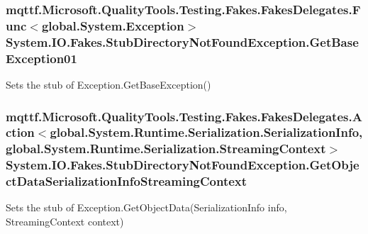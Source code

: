\hypertarget{class_system_1_1_i_o_1_1_fakes_1_1_stub_directory_not_found_exception_a0cdb13e15c8ffdb3b9c954b8de957e8c}{
\subsubsection[{Get\-Base\-Exception01}]{\setlength{\rightskip}{0pt plus 5cm}mqttf.\-Microsoft.\-Quality\-Tools.\-Testing.\-Fakes.\-Fakes\-Delegates.\-Func$<$global.\-System.\-Exception$>$ System.\-I\-O.\-Fakes.\-Stub\-Directory\-Not\-Found\-Exception.\-Get\-Base\-Exception01}}\label{class_system_1_1_i_o_1_1_fakes_1_1_stub_directory_not_found_exception_a0cdb13e15c8ffdb3b9c954b8de957e8c}


Sets the stub of Exception.\-Get\-Base\-Exception()

\hypertarget{class_system_1_1_i_o_1_1_fakes_1_1_stub_directory_not_found_exception_afe59435a6c42ded16fccb94803841468}{
\subsubsection[{Get\-Object\-Data\-Serialization\-Info\-Streaming\-Context}]{\setlength{\rightskip}{0pt plus 5cm}mqttf.\-Microsoft.\-Quality\-Tools.\-Testing.\-Fakes.\-Fakes\-Delegates.\-Action$<$global.\-System.\-Runtime.\-Serialization.\-Serialization\-Info, global.\-System.\-Runtime.\-Serialization.\-Streaming\-Context$>$ System.\-I\-O.\-Fakes.\-Stub\-Directory\-Not\-Found\-Exception.\-Get\-Object\-Data\-Serialization\-Info\-Streaming\-Context}}\label{class_system_1_1_i_o_1_1_fakes_1_1_stub_directory_not_found_exception_afe59435a6c42ded16fccb94803841468}


Sets the stub of Exception.\-Get\-Object\-Data(\-Serialization\-Info info, Streaming\-Context context)

